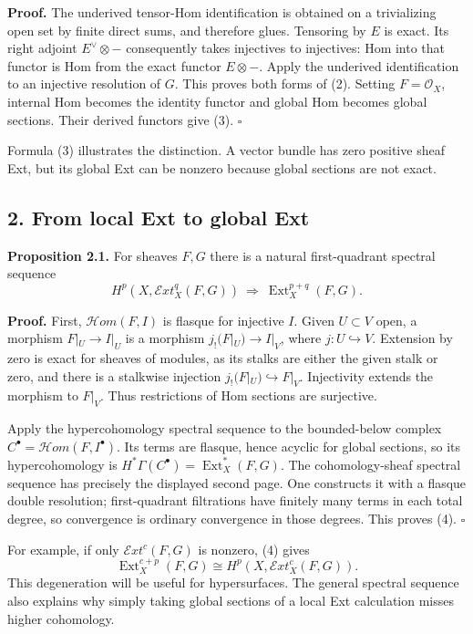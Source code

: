 \documentclass[11pt]{article}
\begin{document}
\textbf{Proof.} The underived tensor-Hom identification is obtained on a
trivializing open set by finite direct sums, and therefore glues.
Tensoring by \(E\) is exact. Its right adjoint \(E^\vee\otimes-\)
consequently takes injectives to injectives: Hom into that functor is
Hom from the exact functor \(E\otimes-\). Apply the underived
identification to an injective resolution of \(G\). This proves both
forms of (2). Setting \(F=\mathcal O_X\), internal Hom becomes the
identity functor and global Hom becomes global sections. Their derived
functors give (3). \(\square\)

Formula (3) illustrates the distinction. A vector bundle has zero
positive sheaf Ext, but its global Ext can be nonzero because global
sections are not exact.

\subsection{2. From local Ext to global
Ext}\label{from-local-ext-to-global-ext}

\textbf{Proposition 2.1.} For sheaves \(F,G\) there is a natural
first-quadrant spectral sequence \[
H^p(X,\mathcal E xt^q_X(F,G))
 \ \Longrightarrow\ \operatorname{Ext}^{p+q}_X(F,G).
\tag{4}
\]

\textbf{Proof.} First, \(\mathcal H om(F,I)\) is flasque for injective
\(I\). Given \(U\subset V\) open, a morphism \(F|_U\to I|_U\) is a
morphism \(j_!(F|_U)\to I|_V\), where \(j:U\hookrightarrow V\).
Extension by zero is exact for sheaves of modules, as its stalks are
either the given stalk or zero, and there is a stalkwise injection
\(j_!(F|_U)\hookrightarrow F|_V\). Injectivity extends the morphism to
\(F|_V\). Thus restrictions of Hom sections are surjective.

Apply the hypercohomology spectral sequence to the bounded-below complex
\(C^\bullet=\mathcal H om(F,I^\bullet)\). Its terms are flasque, hence
acyclic for global sections, so its hypercohomology is
\(H^*\Gamma(C^\bullet)=\operatorname{Ext}^*_X(F,G)\). The
cohomology-sheaf spectral sequence has precisely the displayed second
page. One constructs it with a flasque double resolution; first-quadrant
filtrations have finitely many terms in each total degree, so
convergence is ordinary convergence in those degrees. This proves (4).
\(\square\)

For example, if only \(\mathcal E xt^c(F,G)\) is nonzero, (4) gives \[
\operatorname{Ext}^{c+p}_X(F,G)
 \cong H^p(X,\mathcal E xt^c_X(F,G)).
\tag{5}
\] This degeneration will be useful for hypersurfaces. The general
spectral sequence also explains why simply taking global sections of a
local Ext calculation misses higher cohomology.
\end{document}
